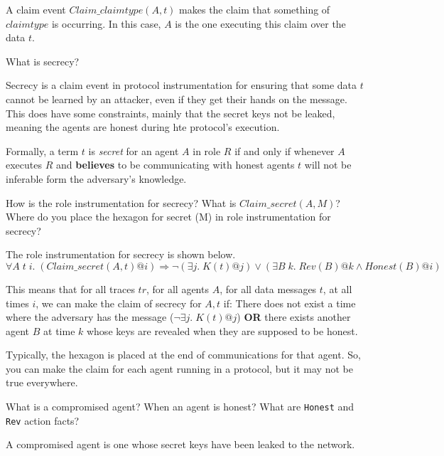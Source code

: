 \begin{questions}
\begin{solution}
    A claim event $Claim\_claimtype(A,t)$ makes the claim that something of $claimtype$ is occurring.
    In this case, $A$ is the one executing this claim over the data $t$.
  \end{solution}

\question{} What is secrecy?
  \begin{solution}
    Secrecy is a claim event in protocol instrumentation for ensuring that some data $t$ cannot be learned by an attacker, even if they get their hands on the message.
    This does have some constraints, mainly that the secret keys not be leaked, meaning the agents are honest during hte protocol's execution.

    Formally, a term $t$ is \emph{secret} for an agent $A$ in role $R$ if and only if whenever $A$ executes $R$ and \textbf{believes} to be communicating with honest agents $t$ will not be inferable form the adversary's knowledge.
  \end{solution}

\question{} How is the role instrumentation for secrecy? What is $Claim\_secret(A,M)$? Where do you place the hexagon for secret (M) in role instrumentation for secrecy?
  \begin{solution}
    The role instrumentation for secrecy is shown below.
    \begin{equation}\label{eq:Role_Instrumentation_Secrecy}
      \forall A \; t \; i.\; (Claim\_secret(A, t)@i) \Rightarrow \neg(\exists j.\; K(t)@j) \vee (\exists B \; k. \; Rev(B)@k \wedge Honest(B)@i)
    \end{equation}

    This means that for all traces $tr$, for all agents $A$, for all data messages $t$, at all times $i$, we can make the claim of secrecy for $A, t$ if: There does not exist a time where the adversary has the message ($\neg \exists j.\; K(t)@j$) \textbf{OR} there exists another agent $B$ at time $k$ whose keys are revealed when they are supposed to be honest.

    Typically, the hexagon is placed at the end of communications for that agent.
    So, you can make the claim for each agent running in a protocol, but it may not be true everywhere.
  \end{solution}

\question{} What is a compromised agent? When an agent is honest? What are \texttt{Honest} and \texttt{Rev} action facts?
  \begin{solution}
    A compromised agent is one whose secret keys have been leaked to the network.


\end{solution}
\end{questions}
